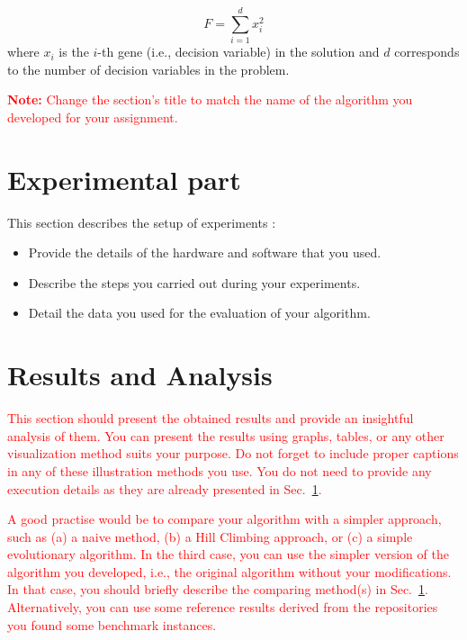 \documentclass{scrartcl}
\begin{document}
\begin{equation}
    F = \sum_{i=1}^d x_i^2 
\end{equation}
where $x_i$ is the $i$-th gene (i.e., decision variable) in the solution and $d$ corresponds to the number of decision variables in the problem.

\textcolor{red}{\textbf{Note:} Change the section's title to match the name of the algorithm you developed for your assignment.}

\lipsum[3]


\section{Experimental part}
\label{sec:experimentation}

{\color{red}
This section describes the setup of experiments \cite{zobel2014experimentation}:

\begin{itemize}
    \item Provide the details of the hardware and software that you used.
    \item Describe the steps you carried out during your experiments.
    \item Detail the data you used for the evaluation of your algorithm.
\end{itemize}
}

\lipsum[4]


\section{Results and Analysis}
\label{sec:results-analysis}

\textcolor{red}{This section should present the obtained results and provide an insightful analysis of them. You can present the results using graphs, tables, or any other visualization method suits your purpose. Do not forget to include proper captions \cite{zobel2014graphs} in any of these illustration methods you use. You do not need to provide any execution details as they are already presented in Sec.~\ref{sec:experimentation}.}

\textcolor{red}{A good practise would be to compare your algorithm with a simpler approach, such as (a) a naive method, (b) a Hill Climbing approach, or (c) a simple evolutionary algorithm. In the third case, you can use the simpler version of the algorithm you developed, i.e., the original algorithm without your modifications. In that case, you should briefly describe the comparing method(s) in Sec.~\ref{sec:experimentation}. Alternatively, you can use some reference results derived from the repositories you found some benchmark instances.}
\end{document}
